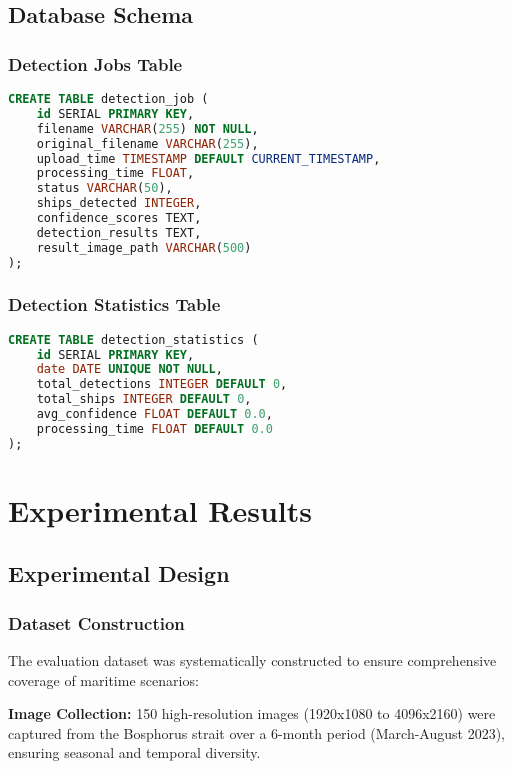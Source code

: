 \documentclass[a4paper,11pt]{article}
\begin{document}
\subsection{Database Schema}

\subsubsection{Detection Jobs Table}
\begin{lstlisting}[language=SQL, caption=Detection Jobs Schema]
CREATE TABLE detection_job (
    id SERIAL PRIMARY KEY,
    filename VARCHAR(255) NOT NULL,
    original_filename VARCHAR(255),
    upload_time TIMESTAMP DEFAULT CURRENT_TIMESTAMP,
    processing_time FLOAT,
    status VARCHAR(50),
    ships_detected INTEGER,
    confidence_scores TEXT,
    detection_results TEXT,
    result_image_path VARCHAR(500)
);
\end{lstlisting}

\subsubsection{Detection Statistics Table}
\begin{lstlisting}[language=SQL, caption=Statistics Schema]
CREATE TABLE detection_statistics (
    id SERIAL PRIMARY KEY,
    date DATE UNIQUE NOT NULL,
    total_detections INTEGER DEFAULT 0,
    total_ships INTEGER DEFAULT 0,
    avg_confidence FLOAT DEFAULT 0.0,
    processing_time FLOAT DEFAULT 0.0
);
\end{lstlisting}

\section{Experimental Results}

\subsection{Experimental Design}

\subsubsection{Dataset Construction}
The evaluation dataset was systematically constructed to ensure comprehensive coverage of maritime scenarios:

\textbf{Image Collection:} 150 high-resolution images (1920x1080 to 4096x2160) were captured from the Bosphorus strait over a 6-month period (March-August 2023), ensuring seasonal and temporal diversity.
\end{document}
